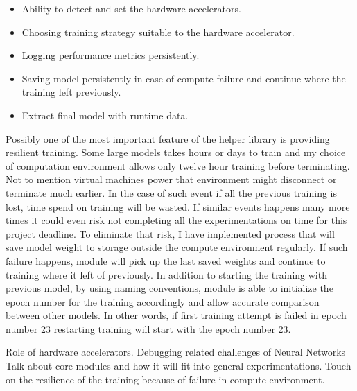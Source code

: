 \begin{itemize}
  \item Ability to detect and set the hardware accelerators.
  \item Choosing training strategy suitable to the hardware accelerator.
  \item Logging performance metrics persistently.
  \item Saving model persistently in case of compute failure and continue where the training left previously.
  \item Extract final model with runtime data.
\end{itemize}
 
Possibly one of the most important feature of the helper library is providing resilient training. Some large models takes hours or days to train and my choice of computation environment allows only twelve hour training before terminating. Not to mention virtual machines power that environment might disconnect or terminate much earlier. In the case of such event if all the previous training is lost, time spend on training will be wasted. If similar events happens many more times it could even risk not completing all the experimentations on time for this project deadline. To eliminate that risk, I have implemented process that will save model weight to storage outside the compute environment regularly. If such failure happens, module will pick up the last saved weights and continue to training where it left of previously. In addition to starting the training with previous model, by using naming conventions, module is able to initialize the epoch number for the training accordingly and allow accurate comparison between other models. In other words, if first training attempt is failed in epoch number 23 restarting training will start with the epoch number 23.




Role of hardware accelerators. Debugging related challenges of Neural Networks
Talk about core modules and how it will fit into general experimentations. 
Touch on the resilience of the training because of failure in compute environment.
\clearpage